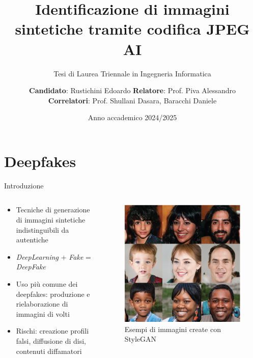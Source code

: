 \documentclass[11pt]{beamer}
\title{Identificazione di immagini sintetiche tramite codifica JPEG AI}
\subtitle{Tesi di Laurea Triennale in Ingegneria Informatica}
\author{
\textbf{Candidato}: Rustichini Edoardo \quad 
\textbf{Relatore}: Prof. Piva Alessandro \\
\textbf{Correlatori}: Prof. Shullani Dasara, Baracchi Daniele
}
\institute{Università degli Studi di Firenze}
\date{Anno accademico 2024/2025}
\begin{document}
\maketitle

\section{Deepfakes}
\begin{frame}{Introduzione}
\begin{columns}
\begin{column}{0.55\textwidth}
    \begin{itemize}
        \item Tecniche di generazione di immagini sintetiche indistinguibili da autentiche
        \item \textit{DeepLearning} + \textit{Fake}  = \textit{DeepFake}
        \item  Uso più comune dei deepfakes: produzione e rielaborazione di immagini di volti
        \item Rischi: creazione profili falsi, diffusione di disi, contenuti diffamatori
    \end{itemize}
\end{column}
\begin{column}{0.45\textwidth}
        \begin{figure}
            \centering
            \includegraphics[width=0.75\linewidth]{assets/esGAN.png}
            \caption{Esempi di immagini create con StyleGAN}
            \label{fig:placeholder}
        \end{figure}
\end{column}
\end{columns}
\end{frame}
\end{document}
